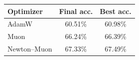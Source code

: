\begin{tabular}{lcc}
\toprule
\textbf{Optimizer} & \textbf{Final acc.} & \textbf{Best acc.} \\
\midrule
AdamW & 60.51\% & 60.98\% \\
Muon & 66.24\% & 66.39\% \\
Newton--Muon & 67.33\% & 67.49\% \\
\bottomrule
\end{tabular}
